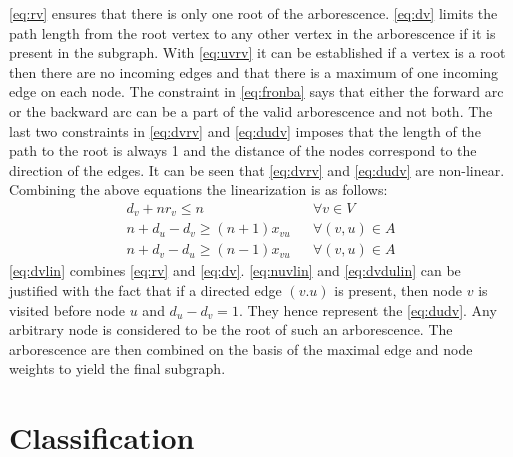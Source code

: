 \documentclass[msthesis.tex]{subfiles}
\begin{document}
 \autoref{eq:rv} ensures that there is only one root of the arborescence. \autoref{eq:dv} limits the path length from the root vertex to any other vertex in the arborescence if it is present in the subgraph. With \autoref{eq:uvrv} it can be established if a vertex is a root then there are no incoming edges and that there is a maximum of one incoming edge on each node. The constraint in \autoref{eq:fronba} says that either the forward arc or the backward arc can be a part of the valid arborescence and not both. The last two constraints in \autoref{eq:dvrv}  and \autoref{eq:dudv} imposes that the length of the path to the root is always 1 and the distance of the nodes correspond to the direction of the edges.
It can be seen that  \autoref{eq:dvrv} and \autoref{eq:dudv} are non-linear. Combining the above equations the linearization is as follows:
\begin{align}
    \label{eq:dvlin}
    d_v + n r_v \leq n && \forall v \in V\\
    \label{eq:nuvlin}
    n + d_u - d_v \geq (n+1) x_{vu} && \forall (v,u) \in A\\
    \label{eq:dvdulin}
    n + d_v - d_u \geq (n-1) x_{vu} && \forall (v,u) \in A
\end{align}
\autoref{eq:dvlin} combines \autoref{eq:rv} and \autoref{eq:dv}. \autoref{eq:nuvlin} and \autoref{eq:dvdulin} can be justified with the fact that if a directed edge $(v.u)$ is present, then node $v$ is visited before node $u$ and $d_u - d_v = 1$. They hence represent the \autoref{eq:dudv}.
Any arbitrary node is considered to be the root of such an arborescence. The arborescence are then combined on the basis of the maximal edge and node weights to yield the final subgraph. 

\section{Classification}
\end{document}
